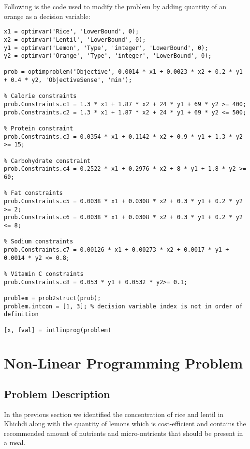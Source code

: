 \documentclass[
]{article}
\begin{document}
\newpage

Following is the code used to modify the problem by adding quantity of an orange as a decision variable:
\begin{lstlisting}[numbers=none]
x1 = optimvar('Rice', 'LowerBound', 0);
x2 = optimvar('Lentil', 'LowerBound', 0);
y1 = optimvar('Lemon', 'Type', 'integer', 'LowerBound', 0);
y2 = optimvar('Orange', 'Type', 'integer', 'LowerBound', 0);

prob = optimproblem('Objective', 0.0014 * x1 + 0.0023 * x2 + 0.2 * y1 + 0.4 * y2, 'ObjectiveSense', 'min');

% Calorie constraints
prob.Constraints.c1 = 1.3 * x1 + 1.87 * x2 + 24 * y1 + 69 * y2 >= 400;
prob.Constraints.c2 = 1.3 * x1 + 1.87 * x2 + 24 * y1 + 69 * y2 <= 500;

% Protein constraint
prob.Constraints.c3 = 0.0354 * x1 + 0.1142 * x2 + 0.9 * y1 + 1.3 * y2 >= 15;

% Carbohydrate constraint
prob.Constraints.c4 = 0.2522 * x1 + 0.2976 * x2 + 8 * y1 + 1.8 * y2 >= 60;

% Fat constraints
prob.Constraints.c5 = 0.0038 * x1 + 0.0308 * x2 + 0.3 * y1 + 0.2 * y2 >= 2;
prob.Constraints.c6 = 0.0038 * x1 + 0.0308 * x2 + 0.3 * y1 + 0.2 * y2 <= 8;

% Sodium constraints
prob.Constraints.c7 = 0.00126 * x1 + 0.00273 * x2 + 0.0017 * y1 + 0.0014 * y2 <= 0.8;

% Vitamin C constraints
prob.Constraints.c8 = 0.053 * y1 + 0.0532 * y2>= 0.1;

problem = prob2struct(prob);
problem.intcon = [1, 3]; % decision variable index is not in order of definition

[x, fval] = intlinprog(problem)
\end{lstlisting}

\newpage

\hypertarget{non-linear-programming-problem}{%
	\section{Non-Linear Programming
	 Problem}\label{non-linear-programming-problem}}

\hypertarget{problem-description-2}{%
	\subsection{Problem Description}\label{problem-description-2}}

In the previous section we identified the concentration of rice and lentil in Khichdi along with the quantity of lemons which
is cost-efficient and contains the recommended amount of nutrients and micro-nutrients that should be present in a meal.
\end{document}
